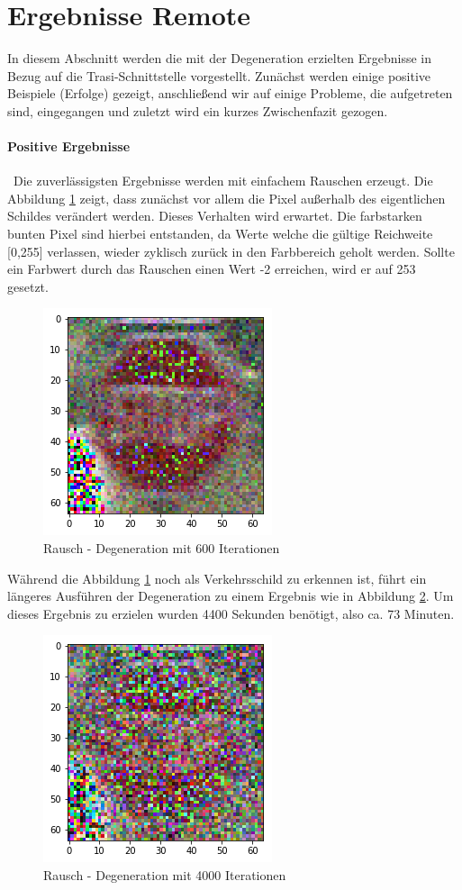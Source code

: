 \section{Ergebnisse Remote}
\label{sec:DegenerationErgebnisse}
In diesem Abschnitt werden die mit der Degeneration erzielten Ergebnisse in Bezug auf die Trasi-Schnittstelle vorgestellt.
Zunächst werden einige positive Beispiele (Erfolge) gezeigt, anschließend wir auf einige Probleme, die aufgetreten sind, eingegangen und zuletzt wird ein kurzes Zwischenfazit gezogen. 
\paragraph{Positive Ergebnisse} ~\newline Die zuverlässigsten Ergebnisse werden mit einfachem Rauschen erzeugt. 
Die Abbildung \ref{fig:stoptiefe600} zeigt, dass zunächst vor allem die Pixel außerhalb des eigentlichen Schildes verändert werden. 
Dieses Verhalten wird erwartet. 
Die farbstarken bunten Pixel sind hierbei entstanden, da Werte welche die gültige Reichweite [0,255] verlassen, wieder zyklisch zurück in den Farbbereich geholt werden. 
Sollte ein Farbwert durch das Rauschen einen Wert -2 erreichen, wird er auf 253 gesetzt.  

\begin{figure}[h]
	\centering
	\includegraphics[width=0.4\linewidth]{Images/DegenSamples/StopTiefe600}
	\caption[Degeneration Tiefe 600]{Rausch - Degeneration mit 600 Iterationen}
	\label{fig:stoptiefe600}
\end{figure}

Während die Abbildung \ref{fig:stoptiefe600} noch als Verkehrsschild zu erkennen ist, führt ein längeres Ausführen der Degeneration zu einem Ergebnis wie in Abbildung \ref{fig:stoptiefe4000}. 
Um dieses Ergebnis zu erzielen wurden 4400 Sekunden benötigt, also ca. 73 Minuten.

\begin{figure}[h]
	\centering
	\includegraphics[width=0.4\linewidth]{Images/DegenSamples/StopTiefe4000}
	\caption[Degeneration Tiefe 4000]{Rausch - Degeneration mit 4000 Iterationen}
	\label{fig:stoptiefe4000}
\end{figure}

